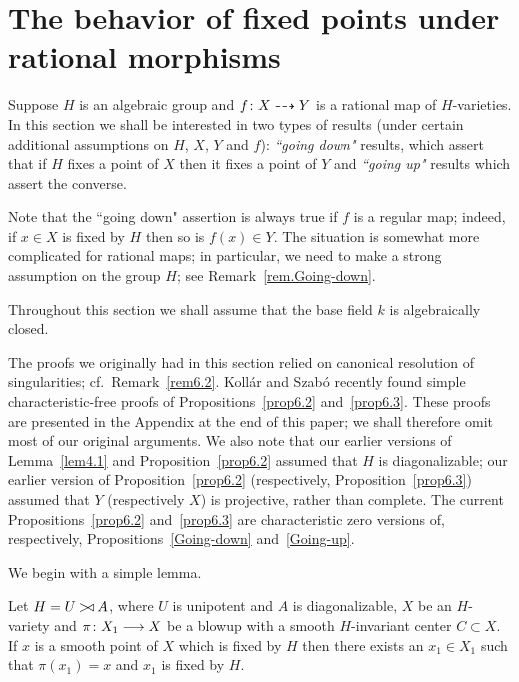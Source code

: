 
\section{The behavior of fixed points under rational morphisms}
\label{sect5}

Suppose $H$ is an algebraic group and $f\colon X \dasharrow Y$ is a rational 
map of $H$-varieties. In this section we shall be interested in two types 
of results (under certain additional assumptions on $H$, 
$X$, $Y$ and $f$): {\em ``going down"} results, which assert that 
if $H$ fixes a point of $X$ then it fixes a point of $Y$ and 
{\em ``going up"} results which assert the converse. 

Note that the ``going down" assertion is always true
if $f$ is a regular map; indeed, if $x \in X$ is fixed by $H$ then so is
$f(x) \in Y$. The situation is somewhat more complicated for rational maps; 
in particular, we need to make a strong assumption on the group $H$; see 
Remark~\ref{rem.Going-down}.

Throughout this section we shall assume that the base field $k$ is 
algebraically closed.

The proofs we originally had in this section relied on canonical resolution 
of singularities; cf.\ Remark~\ref{rem6.2}. 
Koll\'ar and Szab\'o recently found simple characteristic-free 
proofs of Propositions~\ref{prop6.2} and~\ref{prop6.3}. 
These proofs are presented in the Appendix at the end of this paper; we shall 
therefore omit most of our original arguments. We also note that 
our earlier versions of Lemma~\ref{lem4.1} 
and Proposition~\ref{prop6.2} assumed that $H$ is diagonalizable; our
earlier version of Proposition~\ref{prop6.2} (respectively, 
Proposition~\ref{prop6.3}) assumed that $Y$ (respectively 
$X$) is projective, rather than complete. The current 
Propositions~\ref{prop6.2} and~\ref{prop6.3} are characteristic zero versions
of, respectively, Propositions~\ref{Going-down} and~\ref{Going-up}.

We begin with a simple lemma.

\begin{lem} \label{lem4.1}
Let $H = U \mathbin{{>}\!{\triangleleft}} A$, where $U$ is unipotent and $A$ is diagonalizable,
$X$ be an $H$-variety and
$\pi\colon X_1 \longrightarrow X$ be a blowup with a smooth $H$-invariant center 
$C \subset X$.
If $x$ is a smooth point of $X$ which is fixed by $H$ then there exists
an $x_1 \in X_1$ such that $\pi(x_1) = x$ and $x_1$ is fixed by $H$.
\end{lem}

